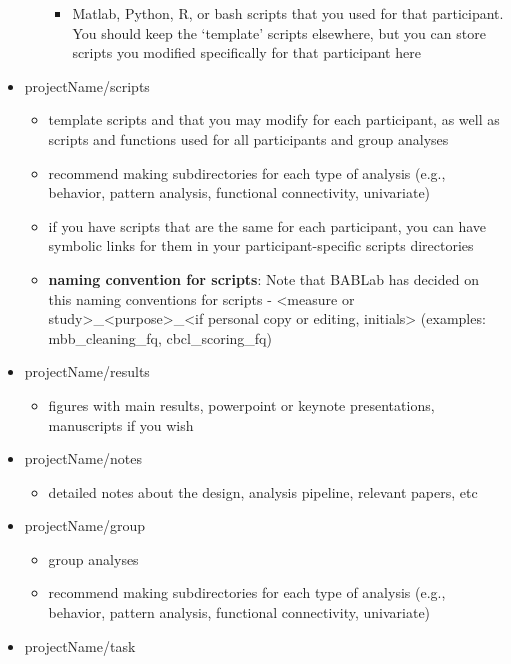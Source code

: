 \documentclass[]{book}
\providecommand{\tightlist}{%
  \setlength{\itemsep}{0pt}\setlength{\parskip}{0pt}}
\begin{document}
\begin{itemize}
\begin{itemize}
    \begin{itemize}
    \tightlist
    \item
      Matlab, Python, R, or bash scripts that you used for that participant. You should keep the `template' scripts elsewhere, but you can store scripts you modified specifically for that participant here
    \end{itemize}
  \end{itemize}
\item
  projectName/scripts

  \begin{itemize}
  \tightlist
  \item
    template scripts and that you may modify for each participant, as well as scripts and functions used for all participants and group analyses
  \item
    recommend making subdirectories for each type of analysis (e.g., behavior, pattern analysis, functional connectivity, univariate)
  \item
    if you have scripts that are the same for each participant, you can have symbolic links for them in your participant-specific scripts directories
  \item
    \textbf{naming convention for scripts}: Note that BABLab has decided on this naming conventions for scripts - \textless{}measure or study\textgreater{}\_\textless{}purpose\textgreater{}\_\textless{}if personal copy or editing, initials\textgreater{} (examples: mbb\_cleaning\_fq, cbcl\_scoring\_fq)
  \end{itemize}
\item
  projectName/results

  \begin{itemize}
  \tightlist
  \item
    figures with main results, powerpoint or keynote presentations, manuscripts if you wish
  \end{itemize}
\item
  projectName/notes

  \begin{itemize}
  \tightlist
  \item
    detailed notes about the design, analysis pipeline, relevant papers, etc
  \end{itemize}
\item
  projectName/group

  \begin{itemize}
  \tightlist
  \item
    group analyses
  \item
    recommend making subdirectories for each type of analysis (e.g., behavior, pattern analysis, functional connectivity, univariate)
  \end{itemize}
\item
  projectName/task


\end{itemize}
\end{document}
